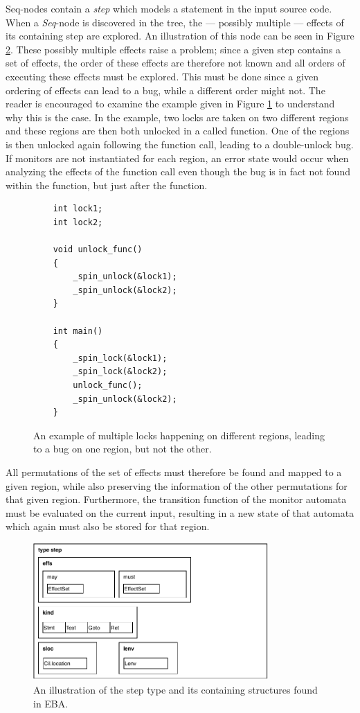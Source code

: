 \newpar Seq-nodes contain a \textit{step} which models a statement in the input source code. When a \textit{Seq}-node is discovered in the tree, the --- possibly multiple --- effects of its containing step are explored. An illustration of this node can be seen in Figure \ref{cfg-step}. These possibly multiple effects raise a problem; since a given step contains a set of effects, the order of these effects are therefore not known and all orders of executing these effects must be explored. This must be done since a given ordering of effects can lead to a bug, while a different order might not. The reader is encouraged to examine the example given in Figure \ref{multiple-region-example} to understand why this is the case. In the example, two locks are taken on two different regions and these regions are then both unlocked in a called function. One of the regions is then unlocked again following the function call, leading to a double-unlock bug. If monitors are not instantiated for each region, an error state would occur when analyzing the effects of the function call even though the bug is in fact not found within the function, but just after the function. 

\begin{figure}[H]
    \centering
    \begin{verbatim}
    int lock1;
    int lock2;

    void unlock_func()
    {
        _spin_unlock(&lock1);
        _spin_unlock(&lock2);
    }

    int main()
    {
        _spin_lock(&lock1);
        _spin_lock(&lock2);
        unlock_func();
        _spin_unlock(&lock2);
    }
    \end{verbatim}
    \caption{An example of multiple locks happening on different regions, leading to a bug on one region, but not the other.}
    \label{multiple-region-example}
\end{figure}

All permutations of the set of effects must therefore be found and mapped to a given region, while also preserving the information of the other permutations for that given region. Furthermore, the transition function of the monitor automata must be evaluated on the current input, resulting in a new state of that automata which again must also be stored for that region.

\begin{figure}[H]
    \centering
    \includegraphics[width=0.8\textwidth]{implementation/figures/step}
    \caption{An illustration of the step type and its containing structures found in EBA.}
    \label{cfg-step}
\end{figure}

